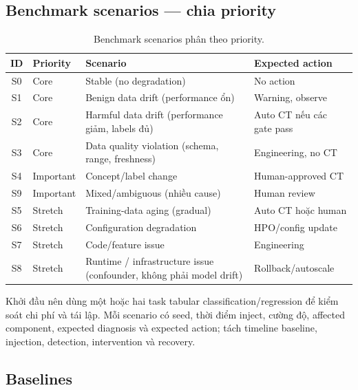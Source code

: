 \documentclass[11pt,a4paper]{article}
\begin{document}
\subsection{Benchmark scenarios --- chia priority}

\begin{table}[ht]
\centering
\small
\caption{Benchmark scenarios phân theo priority.}
\begin{tabularx}{\linewidth}{@{}c P{1.8cm} P{3.2cm} Y@{}}
\toprule
\textbf{ID} & \textbf{Priority} & \textbf{Scenario} & \textbf{Expected action} \\
\midrule
S0 & Core & Stable (no degradation) & No action \\
S1 & Core & Benign data drift (performance ổn) & Warning, observe \\
S2 & Core & Harmful data drift (performance giảm, labels đủ) & Auto CT nếu các gate pass \\
S3 & Core & Data quality violation (schema, range, freshness) & Engineering, no CT \\
\midrule
S4 & Important & Concept/label change & Human-approved CT \\
S9 & Important & Mixed/ambiguous (nhiều cause) & Human review \\
\midrule
S5 & Stretch & Training-data aging (gradual) & Auto CT hoặc human \\
S6 & Stretch & Configuration degradation & HPO/config update \\
S7 & Stretch & Code/feature issue & Engineering \\
S8 & Stretch & Runtime / infrastructure issue (confounder, không phải model drift) & Rollback/autoscale \\
\bottomrule
\end{tabularx}
\end{table}

Khởi đầu nên dùng một hoặc hai task tabular classification/regression để kiểm soát chi phí và tái lập. Mỗi scenario có seed, thời điểm inject, cường độ, affected component, expected diagnosis và expected action; tách timeline baseline, injection, detection, intervention và recovery.

\subsection{Baselines}
\end{document}
